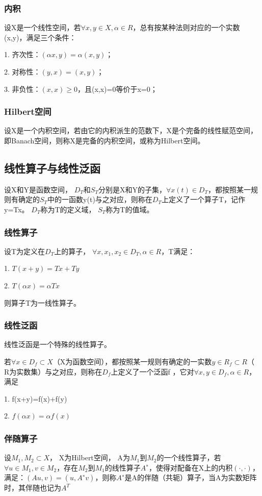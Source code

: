 \documentclass{article}
\begin{document}
\subsubsection{内积}
设X是一个线性空间，若$\forall x,y\in X, \alpha\in R$，总有按某种法则对应的一个实数(x,y)，满足三个条件：

1. 齐次性：$(\alpha x,y)=\alpha(x,y)$；

2. 对称性：$(y,x)=(x,y)$；

3. 非负性：$(x,x)\ge0$，且(x,x)=0等价于x=0；

\subsubsection{Hilbert空间}
设X是一个内积空间，若由它的内积派生的范数下，X是个完备的线性赋范空间，即Banach空间，则称X是完备的内积空间，或称为Hilbert空间。

\subsection{线性算子与线性泛函}
设X和Y是函数空间， $D_T$和$S_T$分别是X和Y的子集，$\forall x(t)\in D_T$，都按照某一规则有确定的$S_T$中的一函数y(t)与之对应，则称在$D_T$上定义了一个算子T，记作y=Tx。 $D_T$称为T的定义域， $S_T$称为T的值域。

\subsubsection{线性算子}
设T为定义在$D_T$上的算子， $\forall x,x_1,x_2\in D_T,\alpha\in R$，T满足：

1. $T(x+y)=Tx+Ty$

2. $T(\alpha x) = \alpha Tx$

则算子T为一线性算子。

\subsubsection{线性泛函}
线性泛函是一个特殊的线性算子。

若$\forall x\in D_f\subset X$（X为函数空间），都按照某一规则有确定的一实数$y\in R_f\subset R$（ R为实数集）与之对应，则称在$D_f$上定义了一个泛函f ，它对$\forall x,y\in D_f,\alpha\in R$，满足

1. f(x+y)=f(x)+f(y)

2. $f(\alpha x)=\alpha f(x)$

\subsubsection{伴随算子}
设$M_1,M_2\subset X$， X为Hilbert空间， A为$M_1$到$M_2$的一个线性算子，若$\forall u \in M_1,v\in M_2$，存在$M_2$到$M_1$的线性算子$A^∗$，使得对配备在X上的内积$(\cdot,\cdot)$，满足：$(Au,v)=(u,A^∗v)$，则称$A^∗$是A的伴随（共轭）算子，当A为实数矩阵时，其伴随也记为$A^T$
\end{document}
